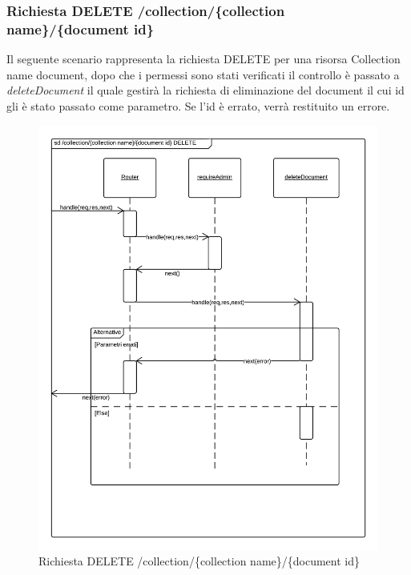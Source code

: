 \subsubsection{Richiesta DELETE /collection/\{collection name\}/\{document id\}}
Il seguente scenario rappresenta la richiesta DELETE per una risorsa Collection name document, dopo che i permessi sono stati verificati il controllo è passato a \emph{deleteDocument} il quale gestirà la richiesta di eliminazione del document il cui id gli è stato passato come parametro. Se l'id è errato, verrà restituito un errore.
\begin{figure}[H]
	\begin{center} 
		\includegraphics[scale=0.20]{scenari/Collection Name Document DELETE.png} 
		\caption{Richiesta DELETE /collection/\{collection name\}/\{document id\}}
	\end{center} 
\end{figure}

\pagebreak
